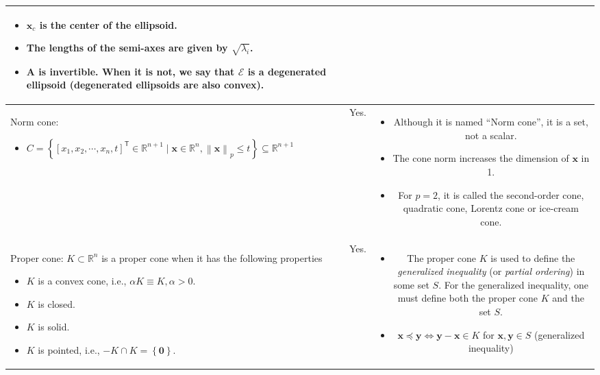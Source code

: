 \documentclass{article}
\newcommand{\trans}{\mathsf{T}}
\newcommand\norm[1]{\left\lVert#1\right\rVert}
\begin{document}
\begin{table}[ht!]
\begin{tabularx}{\textwidth}{|A|B|C|}
\begin{itemize}[leftmargin=*]
    \item \(\mathbf{x}_{c}\) is the center of the ellipsoid.
    \item The lengths of the semi-axes are given by \(\sqrt{\lambda_i}\).
    \item \(\mathbf{A}\) is invertible. When it is not, we say that \(\mathcal{E}\) is a degenerated ellipsoid (degenerated ellipsoids are also convex).
\end{itemize}\\
\hline
Norm cone:
\begin{itemize}[leftmargin=*]
    \item \(C = \left\{ [x_1, x_2, \cdots, x_n, t]^\trans \in \mathbb{R}^{n+1} \mid \mathbf{x} \in \mathbb{R}^{n}, \norm{\mathbf{x}}_{p} \leq t \right\} \subseteq \mathbb{R}^{n+1}\)
\end{itemize} & Yes. & \vspace{-3.5ex}
\begin{itemize}[leftmargin=*]
    \item Although it is named ``Norm cone'', it is a set, not a scalar.
    \item The cone norm increases the dimension of \(\mathbf{x}\) in 1.
    \item For \(p=2\), it is called the second-order cone, quadratic cone,  Lorentz cone or ice-cream cone.
\end{itemize} \\
\hline
Proper cone: \(K \subset \mathbb{R}^{n}\) is a proper cone when it has the following properties
\begin{itemize}
    \item \(K\) is a convex cone, i.e., \(\alpha K \equiv K, \alpha > 0\).
    \item \(K\) is closed.
    \item \(K\) is solid.
    \item \(K\) is pointed, i.e., \(-K \cap K = \left\{ \mathbf{0} \right\}\).
\end{itemize} & Yes. & \vspace{-3.5ex} \begin{itemize}[leftmargin=*]
    \item The proper cone \(K\) is used to define the \emph{generalized inequality} (or \emph{partial ordering}) in some set \(S\). For the generalized inequality, one must define both the proper cone \(K\) and the set \(S\).
    \item \(\mathbf{x} \preceq \mathbf{y} \iff \mathbf{y} - \mathbf{x} \in K\) for \(\mathbf{x}, \mathbf{y} \in S\) (generalized inequality)

\end{itemize}
\end{tabularx}
\end{table}
\end{document}
